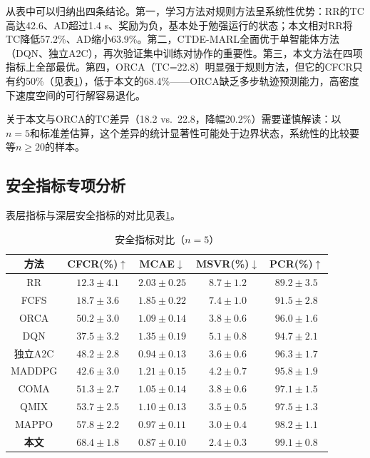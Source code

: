 \documentclass[12pt,a4paper,UTF8]{ctexart}
\begin{document}
从表中可以归纳出四条结论。第一，学习方法对规则方法呈系统性优势：RR的TC高达42.6、AD超过1.4 s、奖励为负，基本处于勉强运行的状态；本文相对RR将TC降低57.2\%、AD缩小63.9\%。第二，CTDE-MARL全面优于单智能体方法（DQN、独立A2C），再次验证集中训练对协作的重要性。第三，本文方法在四项指标上全部最优。第四，ORCA（TC=22.8）明显强于规则方法，但它的CFCR只有约50\%（见表\ref{tab:safety}），低于本文的68.4\%——ORCA缺乏多步轨迹预测能力，高密度下速度空间的可行解容易退化。

关于本文与ORCA的TC差异（18.2 vs.\ 22.8，降幅20.2\%）需要谨慎解读：以$n=5$和标准差估算，这个差异的统计显著性可能处于边界状态，系统性的比较要等$n\geq20$的样本。

\subsection{安全指标专项分析}

表层指标与深层安全指标的对比见表\ref{tab:safety}。

\begin{table}[H]
    \centering
    \caption{安全指标对比（$n=5$）}
    \label{tab:safety}
    \begin{tabular}{|c|c|c|c|c|}
        \hline
        \textbf{方法} & \textbf{CFCR(\%)$\uparrow$} & \textbf{MCAE$\downarrow$} & \textbf{MSVR(\%)$\downarrow$} & \textbf{PCR(\%)$\uparrow$} \\
        \hline
        RR & $12.3\pm4.1$ & $2.03\pm0.25$ & $8.7\pm1.2$ & $89.2\pm3.5$ \\
        FCFS & $18.7\pm3.6$ & $1.85\pm0.22$ & $7.4\pm1.0$ & $91.5\pm2.8$ \\
        ORCA & $50.2\pm3.0$ & $1.09\pm0.14$ & $3.8\pm0.6$ & $96.0\pm1.6$ \\
        DQN & $37.5\pm3.2$ & $1.35\pm0.19$ & $5.1\pm0.8$ & $94.7\pm2.1$ \\
        独立A2C & $48.2\pm2.8$ & $0.94\pm0.13$ & $3.6\pm0.6$ & $96.3\pm1.7$ \\
        MADDPG & $42.6\pm3.0$ & $1.21\pm0.15$ & $4.2\pm0.7$ & $95.8\pm1.9$ \\
        COMA & $51.3\pm2.7$ & $1.05\pm0.14$ & $3.8\pm0.6$ & $97.1\pm1.5$ \\
        QMIX & $53.7\pm2.5$ & $1.10\pm0.13$ & $3.5\pm0.5$ & $97.5\pm1.3$ \\
        MAPPO & $57.8\pm2.2$ & $0.97\pm0.11$ & $3.0\pm0.4$ & $98.2\pm1.1$ \\
        \textbf{本文} & $\mathbf{68.4\pm1.8}$ & $\mathbf{0.87\pm0.10}$ & $\mathbf{2.4\pm0.3}$ & $\mathbf{99.1\pm0.8}$ \\
        \hline
    \end{tabular}
\end{table}
\end{document}
